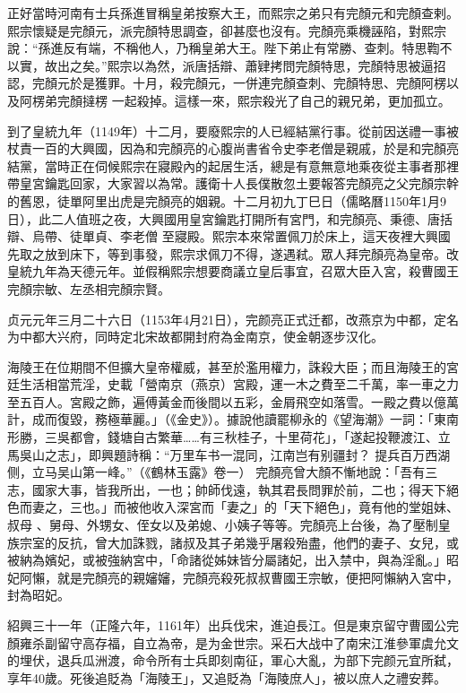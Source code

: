 正好當時河南有士兵孫進冒稱皇弟按察大王，而熙宗之弟只有完顏元和完顏查剌。熙宗懷疑是完顏元，派完顏特思調查，卻甚麼也沒有。完顏亮乘機誣陷，對熙宗說：“孫進反有端，不稱他人，乃稱皇弟大王。陛下弟止有常勝、查刺。特思鞫不以實，故出之矣。”熙宗以為然，派唐括辯、蕭肄拷問完顏特思，完顏特思被逼招認，完顏元於是獲罪。十月，殺完顏元，一併連完顏查刺、完顏特思、完顏阿楞以及阿楞弟完顏撻楞 一起殺掉。這樣一來，熙宗殺光了自己的親兄弟，更加孤立。

到了皇統九年（1149年）十二月，要廢熙宗的人已經結黨行事。從前因送禮一事被杖責一百的大興國，因為和完顏亮的心腹尚書省令史李老僧是親戚，於是和完顏亮結黨，當時正在伺候熙宗在寢殿內的起居生活，總是有意無意地乘夜從主事者那裡帶皇宮鑰匙回家，大家習以為常。護衛十人長僕散忽土要報答完顏亮之父完顏宗幹的舊恩，徒單阿里出虎是完顏亮的姻親。十二月初九丁巳日（儒略曆1150年1月9日），此二人值班之夜，大興國用皇宮鑰匙打開所有宮門，和完顏亮、秉德、唐括辯、烏帶、徒單貞、李老僧 至寢殿。熙宗本來常置佩刀於床上，這天夜裡大興國先取之放到床下，等到事發，熙宗求佩刀不得，遂遇弒。眾人拜完顏亮為皇帝。改皇統九年為天德元年。並假稱熙宗想要商議立皇后事宜，召眾大臣入宮，殺曹國王完顏宗敏、左丞相完顏宗賢。

贞元元年三月二十六日（1153年4月21日），完颜亮正式迁都，改燕京为中都，定名为中都大兴府，同時定北宋故都開封府為金南京，使金朝逐步汉化。

海陵王在位期間不但擴大皇帝權威，甚至於濫用權力，誅殺大臣；而且海陵王的宮廷生活相當荒淫，史載「營南京（燕京）宮殿，運一木之費至二千萬，率一車之力至五百人。宮殿之飾，遍傅黃金而後間以五彩，金屑飛空如落雪。一殿之費以億萬計，成而復毀，務極華麗。」（《金史》）。據說他讀罷柳永的《望海潮》一詞：「東南形勝，三吳都會，錢塘自古繁華……有三秋桂子，十里荷花」，「遂起投鞭渡江、立馬吳山之志」，即興題詩稱：“万里车书一混同，江南岂有别疆封？ 提兵百万西湖侧，立马吴山第一峰。”（《鶴林玉露》卷一） 完顏亮曾大顏不慚地說：「吾有三志，國家大事，皆我所出，一也；帥師伐遠，執其君長問罪於前，二也；得天下絕色而妻之，三也。」而被他收入深宮而「妻之」的「天下絕色」，竟有他的堂姐妹、叔母 、舅母、外甥女、侄女以及弟媳、小姨子等等。完顏亮上台後，為了壓制皇族宗室的反抗，曾大加誅戮，諸叔及其子弟幾乎屠殺殆盡，他們的妻子、女兒，或被納為嬪妃，或被強納宮中，「命諸從姊妹皆分屬諸妃，出入禁中，與為淫亂。」昭妃阿懶，就是完顏亮的親嬸嬸，完顏亮殺死叔叔曹國王宗敏，便把阿懶納入宮中，封為昭妃。

紹興三十一年（正隆六年，1161年）出兵伐宋，進迫長江。但是東京留守曹國公完顏雍杀副留守高存福，自立為帝，是为金世宗。采石大战中了南宋江淮參軍虞允文的埋伏，退兵瓜洲渡，命令所有士兵即刻南征，軍心大亂，为部下完颜元宜所弑，享年40歲。死後追貶為「海陵王」，又追貶為「海陵庶人」，被以庶人之禮安葬。

